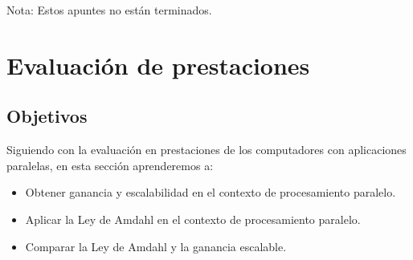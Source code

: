 Nota: Estos apuntes no están terminados.

\newpage
\section{Evaluación de prestaciones}
\subsection{Objetivos}
Siguiendo con la evaluación en prestaciones de los computadores con aplicaciones paralelas, en esta sección aprenderemos a:
\begin{itemize}
    \item Obtener ganancia y escalabilidad en el contexto de procesamiento paralelo.
    \item Aplicar la Ley de Amdahl en el contexto de procesamiento paralelo.
    \item Comparar la Ley de Amdahl y la ganancia escalable.
\end{itemize}
